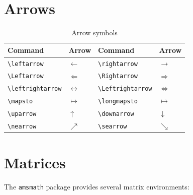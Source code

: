 \section{Arrows}

\begin{table}[H]
\centering
\begin{tabular}{llll}
\toprule
\textbf{Command} & \textbf{Arrow} & \textbf{Command} & \textbf{Arrow} \\
\midrule
\verb|\leftarrow|      & $\leftarrow$      & \verb|\rightarrow|     & $\rightarrow$ \\
\verb|\Leftarrow|      & $\Leftarrow$      & \verb|\Rightarrow|     & $\Rightarrow$ \\
\verb|\leftrightarrow| & $\leftrightarrow$ & \verb|\Leftrightarrow| & $\Leftrightarrow$ \\
\verb|\mapsto|         & $\mapsto$         & \verb|\longmapsto|     & $\longmapsto$ \\
\verb|\uparrow|        & $\uparrow$        & \verb|\downarrow|      & $\downarrow$ \\
\verb|\nearrow|        & $\nearrow$        & \verb|\searrow|        & $\searrow$ \\
\bottomrule
\end{tabular}
\caption{Arrow symbols}
\end{table}

\section{Matrices}

The \texttt{amsmath} package provides several matrix environments:


